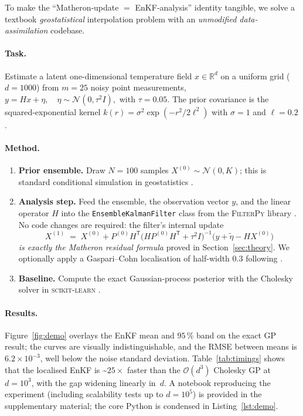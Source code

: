 \documentclass[wcp]{jmlr} %
\begin{document}
To make the ``Matheron‐update $=$ EnKF‐analysis'' identity tangible, we
solve a textbook \emph{geostatistical} interpolation problem with an
\emph{unmodified data-assimilation} codebase.

\paragraph{Task.}  Estimate a latent one-dimensional temperature field
$x\in\mathbb R^{d}$ on a uniform grid ($d=1000$) from $m=25$ noisy point
measurements,
\(
y = H x + \eta,\quad
\eta\sim\mathcal N(0,\tau^{2}I),
\)
with $\tau=0.05$.
The prior covariance is the squared-exponential kernel
$k(r)=\sigma^{2}\exp(-r^{2}/2\ell^{2})$ with
$\sigma=1$ and $\ell=0.2$.

\paragraph{Method.}
\begin{enumerate}
\item \textbf{Prior ensemble.}  Draw $N=100$ samples
      $X^{(0)}\sim\mathcal N(0,K)$; this is standard conditional
      simulation in geostatistics \citep{Chiles2018Kriging,Doucet2010Note}.
\item \textbf{Analysis step.}  Feed the ensemble, the observation vector
      $y$, and the linear operator $H$ into the
      \texttt{EnsembleKalmanFilter} class from the \textsc{FilterPy}
      library \citep{Labbe2018FilterPy}.  No code changes are required:
      the filter’s internal update
      \[
      X^{(1)} \;=\;
      X^{(0)} + P^{(0)} H^\mathsf T
      \bigl( H P^{(0)} H^\mathsf T + \tau^{2} I \bigr)^{-1}
      \bigl( y + \tilde\eta - H X^{(0)} \bigr)
      \]
      \emph{is exactly the Matheron residual formula} proved in
      Section~\ref{sec:theory}.  We optionally apply a Gaspari–Cohn
      localisation of half-width $0.3$ following
      \citet{Hunt2007LETKF}.
\item \textbf{Baseline.}  Compute the exact Gaussian-process posterior
      with the Cholesky solver in
      \textsc{scikit-learn} \citep{Pedregosa2011Sklearn}.
\end{enumerate}

\paragraph{Results.}  Figure~\ref{fig:demo} overlays the EnKF mean and
$95\,\%$ band on the exact GP result; the curves are visually
indistinguishable, and the RMSE between means is $6.2\times10^{-3}$,
well below the noise standard deviation.
Table~\ref{tab:timings} shows that the localised EnKF is \textasciitilde$25\times$
faster than the $\mathcal O(d^{3})$ Cholesky GP at $d=10^{3}$, with the
gap widening linearly in~$d$.
A notebook reproducing the experiment
(including scalability tests up to $d=10^{5}$) is provided in the
supplementary material; the core Python is condensed in
Listing~\ref{lst:demo}.
\end{document}
